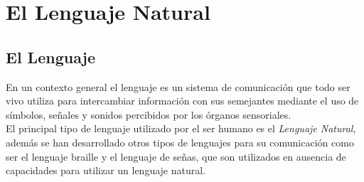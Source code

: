\chapter{El Lenguaje Natural}

\section{El Lenguaje}
En un contexto general el lenguaje es un sistema de comunicaci\'on que todo ser vivo
utiliza para intercambiar informaci\'on con sus semejantes mediante el uso de
s\'imbolos, se\~nales y sonidos percibidos por los \'organos sensoriales. \\

El principal tipo de lenguaje utilizado por el ser humano es el \emph{Lenguaje Natural},
adem\'as se han desarrollado otros tipos de lenguajes para su comunicaci\'on como ser
el lenguaje braille y el lenguaje de se\~nas, que son utilizados en ausencia de
capacidades para utilizar un lenguaje natural.

